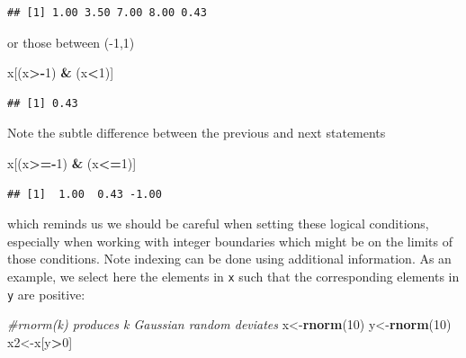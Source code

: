 \documentclass[
]{article}
\newenvironment{Shaded}{\begin{snugshade}}{\end{snugshade}}
\newcommand{\CommentTok}[1]{\textcolor[rgb]{0.56,0.35,0.01}{\textit{#1}}}
\newcommand{\DecValTok}[1]{\textcolor[rgb]{0.00,0.00,0.81}{#1}}
\newcommand{\FunctionTok}[1]{\textcolor[rgb]{0.13,0.29,0.53}{\textbf{#1}}}
\newcommand{\NormalTok}[1]{#1}
\newcommand{\OtherTok}[1]{\textcolor[rgb]{0.56,0.35,0.01}{#1}}
\newcommand{\SpecialCharTok}[1]{\textcolor[rgb]{0.81,0.36,0.00}{\textbf{#1}}}
\begin{document}
\begin{verbatim}
## [1] 1.00 3.50 7.00 8.00 0.43
\end{verbatim}

\noindent or those between (-1,1)

\begin{Shaded}
\begin{Highlighting}[]
\NormalTok{x[(x}\SpecialCharTok{\textgreater{}{-}}\DecValTok{1}\NormalTok{) }\SpecialCharTok{\&}\NormalTok{ (x}\SpecialCharTok{\textless{}}\DecValTok{1}\NormalTok{)]}
\end{Highlighting}
\end{Shaded}

\begin{verbatim}
## [1] 0.43
\end{verbatim}

Note the subtle difference between the previous and next statements

\begin{Shaded}
\begin{Highlighting}[]
\NormalTok{x[(x}\SpecialCharTok{\textgreater{}={-}}\DecValTok{1}\NormalTok{) }\SpecialCharTok{\&}\NormalTok{ (x}\SpecialCharTok{\textless{}=}\DecValTok{1}\NormalTok{)]}
\end{Highlighting}
\end{Shaded}

\begin{verbatim}
## [1]  1.00  0.43 -1.00
\end{verbatim}

\noindent which reminds us we should be careful when setting these
logical conditions, especially when working with integer boundaries
which might be on the limits of those conditions. Note indexing can be
done using additional information. As an example, we select here the
elements in \texttt{x} such that the corresponding elements in
\texttt{y} are positive:

\begin{Shaded}
\begin{Highlighting}[]
\CommentTok{\#rnorm(k) produces k Gaussian random deviates}
\NormalTok{x}\OtherTok{\textless{}{-}}\FunctionTok{rnorm}\NormalTok{(}\DecValTok{10}\NormalTok{)}
\NormalTok{y}\OtherTok{\textless{}{-}}\FunctionTok{rnorm}\NormalTok{(}\DecValTok{10}\NormalTok{)}
\NormalTok{x2}\OtherTok{\textless{}{-}}\NormalTok{x[y}\SpecialCharTok{\textgreater{}}\DecValTok{0}\NormalTok{]}
\end{Highlighting}
\end{Shaded}
\end{document}
